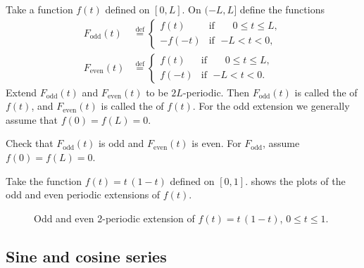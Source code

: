 Take a function $f(t)$ defined on $[0,L]$.  On $(-L,L]$ define the functions
\begin{align*}
F_{\text{odd}}(t) & \overset{\text{def}}{=}
\begin{cases}
f(t) & \text{if } \; \phantom{-}0 \leq t \leq L , \\
-f(-t) & \text{if } \; {-L} < t < 0 ,
\end{cases}
\\
F_{\text{even}}(t) & \overset{\text{def}}{=}
\begin{cases}
f(t) & \text{if } \; \phantom{-}0 \leq t \leq L , \\
f(-t) & \text{if } \; {-L} < t < 0 .
\end{cases}
\end{align*}
Extend $F_{\text{odd}}(t)$ and $F_{\text{even}}(t)$ to be $2L$-periodic.
Then
$F_{\text{odd}}(t)$ is called
the \emph{} of $f(t)$, and
$F_{\text{even}}(t)$ is called the
\emph{} of $f(t)$.
For the odd extension we generally assume that $f(0) = f(L) = 0$.

\begin{exercise}
Check that $F_{\text{odd}}(t)$ is odd and $F_{\text{even}}(t)$ is even.
For $F_{\text{odd}}$,
assume $f(0) = f(L) = 0$.
\end{exercise}

\begin{example}
Take the function $f(t) = t\,(1-t)$ defined on $[0,1]$. 
shows the plots of the odd and even periodic extensions of $f(t)$.

\begin{figure}[h!t]
\capstart
\begin{center}
\quad
{}
\caption{Odd and even 2-periodic extension of $f(t) =
t\,(1-t)$, $0 \leq t \leq 1$.\label{scs:oddevenextfig}}
\end{center}
\end{figure}
\end{example}

\subsection{Sine and cosine series}

